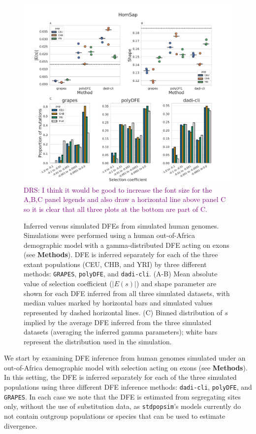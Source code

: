 \documentclass[hidelinks]{article}
\newcommand{\stdpopsim}{\texttt{stdpopsim}\xspace}
\newcommand{\polydfe}{\texttt{polyDFE}\xspace}
\newcommand{\dadicli}{\texttt{dadi-cli}\xspace}
\newcommand{\grapes}{\texttt{GRAPES}\xspace}
\newcommand{\drscomment}[1]{\textcolor{purple}{DRS: #1}}
\begin{document}
    \begin{figure}[b!]
        \centering
        \includegraphics[width=\linewidth]{figures/HomSap/OOA/HomSap_discrete_DFE}
        \drscomment{I think it would be good to increase the font size for the A,B,C panel legends and also
        draw a horizontal line above panel C so it is clear that all three plots at the bottom are part of C.}
        \caption{Inferred versus simulated DFEs from simulated human genomes.
        Simulations were performed using a human out-of-Africa demographic model with a gamma-distributed DFE
        acting on exons (see \textbf{Methods}).
        DFE is inferred separately for each of the three extant populations (CEU, CHB, and YRI)
        by three different methods: \grapes, \polydfe , and \dadicli.
        (A-B) Mean absolute value of selection coefficient ($\lvert E(s) \rvert $) and shape parameter are
        shown for each DFE inferred from all three simulated datasets,
        with median values marked by horizontal bars
        and simulated values represented by dashed horizontal lines.
        (C) Binned distribution of $s$ implied by the average DFE inferred from the three simulated datasets (averaging the inferred gamma parameters);
        white bars represent the distribution used in the simulation.
        }
        \label{fig:homsap-dfe.ooa}
    \end{figure}

 

    We start by examining DFE inference from human genomes simulated under an out-of-Africa demographic model
    with selection acting on exons (see \textbf{Methods}).
    In this setting, the DFE is inferred separately for each of the three simulated populations
    using three different DFE inference methods: \dadicli \citep{Huang2023}, \polydfe \citep{tataru2020polydfe}, 
    and \grapes \citep{galtier2016adaptive}.
    In each case we note that the DFE is estimated from segregating sites only,
    without the use of substitution data, as \stdpopsim's models currently do not
    contain outgroup populations or species that can be used to estimate divergence.
     
\end{document}
